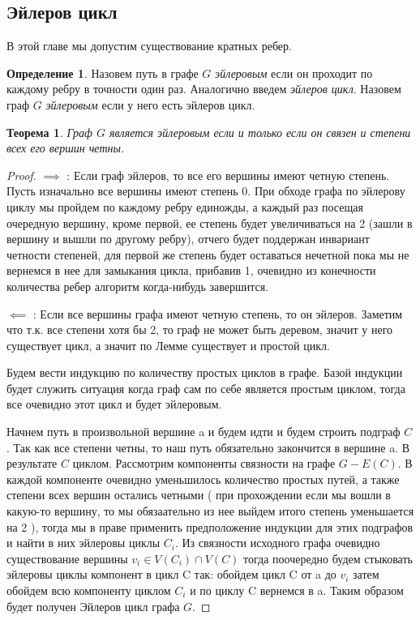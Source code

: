 \documentclass{article}
\newtheorem{theorem}{Теорема}
\theoremstyle{definition}
\newtheorem{definition}{Определение}[section]
\theoremstyle{remark}
\begin{document}
\subsection{Эйлеров цикл}

В этой главе мы допустим существование кратных ребер.

\begin{definition}
    Назовем путь в графе $G$ \textit{эйлеровым} если он проходит по каждому ребру в точности один раз. Аналогично введем \textit{эйлеров цикл}. Назовем граф $G$ \textit{эйлеровым} если у него есть эйлеров цикл.
\end{definition}

\begin{theorem}
    Граф $G$ является эйлеровым если и только если он связен и степени всех его вершин четны.
\end{theorem}

\begin{proof}
    
    $\implies$ : Если граф эйлеров, то все его вершины имеют четную степень. Пусть изначально все вершины имеют степень 0. При обходе графа по эйлерову циклу мы пройдем по каждому ребру единожды, а каждый раз посещая очередную вершину, кроме первой, ее степень будет увеличиваться на 2 (зашли в вершину и вышли по другому ребру), отчего будет поддержан инвариант четности степеней, для первой же степень будет оставаться нечетной пока мы не вернемся в нее для замыкания цикла, прибавив 1, очевидно из конечности количества ребер алгоритм когда-нибудь завершится.
    
    $\impliedby$ : Если все вершины графа имеют четную степень, то он эйлеров. 
    Заметим что т.к. все степени хотя бы 2, то граф не может быть деревом, значит у него существует цикл, а значит по Лемме  существует и простой цикл. 
    
    Будем вести индукцию по количеству простых циклов в графе. Базой индукции будет служить ситуация когда граф сам по себе является простым циклом, тогда все очевидно этот цикл и будет эйлеровым.
    
    Начнем путь в произвольной вершине a и будем идти и будем строить подграф $C$. Так как все степени четны, то наш путь обязательно закончится в вершине a. В результате $C$ циклом. Рассмотрим компоненты связности на графе $G - E(C)$. В каждой компоненте очевидно уменьшилось количество простых путей, а также степени всех вершин остались четными ( при прохождении если мы вошли в какую-то вершину, то мы обязаательно из нее выйдем итого степень уменьшается на 2 ), тогда мы в праве применить предположение индукции для этих подграфов и найти в них эйлеровы циклы $C_i$. Из связности исходного графа очевидно существование вершины $v_i \in V(C_i) \cap V(C)$ тогда поочередно будем стыковать эйлеровы циклы компонент в цикл C так: обойдем цикл C от a до $v_i$ затем обойдем всю компоненту циклом $C_i$ и по циклу C вернемся в a. Таким образом будет получен Эйлеров цикл графа $G$. 
\end{proof}
\end{document}
